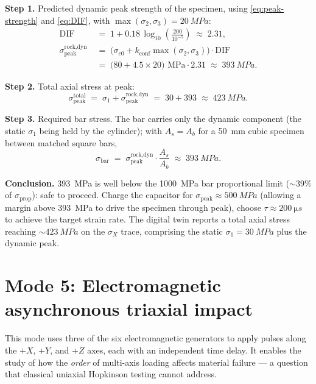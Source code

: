 \documentclass[11pt,a4paper,openany]{book}
\providecommand{\SI}[2]{\qty{#1}{#2}}
\theoremstyle{handbook}
\newcommand{\sig}{\sigma}
\newcommand{\Ab}{A_b}
\newcommand{\As}{A_s}
\newcommand{\sigprop}{\sig_{\text{prop}}}
\newcommand{\sigpeak}{\sig_{\text{peak}}}
\begin{document}
\textbf{Step 1.} Predicted dynamic peak strength of the specimen, using
\eqref{eq:peak-strength} and \eqref{eq:DIF}, with
$\max(\sig_2,\sig_3)=\SI{20}{MPa}$:
\begin{align*}
  \text{DIF} &\;=\; 1 + 0.18\,\log_{10}\!\left(\frac{200}{10^{-5}}\right)
              \;\approx\; 2.31,\\[2pt]
  \sigpeak^{\text{rock,dyn}}
    &\;=\; \bigl(\sig_{c0}+k_{\text{conf}}\max(\sig_2,\sig_3)\bigr)\cdot\text{DIF} \\
    &\;=\; \bigl(80 + 4.5\times 20\bigr)\text{ MPa}\cdot 2.31
    \;\approx\; \SI{393}{MPa}.
\end{align*}

\textbf{Step 2.} Total axial stress at peak:
\begin{equation*}
  \sigpeak^{\text{total}} \;=\; \sig_1 + \sigpeak^{\text{rock,dyn}}
                          \;=\; 30 + 393 \;\approx\; \SI{423}{MPa}.
\end{equation*}

\textbf{Step 3.} Required bar stress. The bar carries only the dynamic
component (the static $\sig_1$ being held by the cylinder); with $\As=\Ab$
for a \SI{50}{mm} cubic specimen between matched square bars,
\begin{equation*}
  \sig_{\text{bar}} \;=\; \sigpeak^{\text{rock,dyn}}\cdot\frac{\As}{\Ab}
                    \;\approx\; \SI{393}{MPa}.
\end{equation*}

\textbf{Conclusion.} \SI{393}{MPa} is well below the \SI{1000}{MPa} bar
proportional limit ($\sim 39\%$ of $\sigprop$): safe to proceed. Charge
the capacitor for $\sigpeak\approx\SI{500}{MPa}$ (allowing a margin above
\SI{393}{MPa} to drive the specimen through peak), choose
$\tau\approx\SI{200}{\micro s}$ to achieve the target strain rate. The
digital twin reports a total axial stress reaching $\sim\SI{423}{MPa}$ on
the $\sig_X$ trace, comprising the static $\sig_1=\SI{30}{MPa}$ plus the
dynamic peak.

\chapter{Mode 5: Electromagnetic asynchronous triaxial impact}\label{ch:mode5}

This mode uses three of the six electromagnetic generators to apply pulses
along the $+X$, $+Y$, and $+Z$ axes, each with an independent time delay.
It enables the study of how the \emph{order} of multi-axis loading affects
material failure --- a question that classical uniaxial Hopkinson testing
cannot address.
\end{document}
